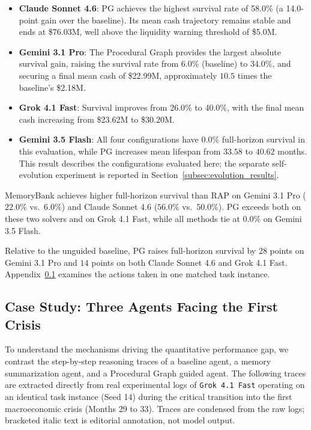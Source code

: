 \begin{itemize}[leftmargin=*]
    \item \textbf{Claude Sonnet 4.6}: PG achieves the highest survival rate of 58.0\% (a 14.0-point gain over the baseline). Its mean cash trajectory remains stable and ends at \$76.03M, well above the liquidity warning threshold of \$5.0M.
    \item \textbf{Gemini 3.1 Pro}: The Procedural Graph provides the largest absolute survival gain, raising the survival rate from 6.0\% (baseline) to 34.0\%, and securing a final mean cash of \$22.99M, approximately $10.5$ times the baseline's \$2.18M.
    \item \textbf{Grok 4.1 Fast}: Survival improves from 26.0\% to 40.0\%, with the final mean cash increasing from \$23.62M to \$30.20M.
    \item \textbf{Gemini 3.5 Flash}: All four configurations have $0.0\%$ full-horizon survival in this evaluation, while PG increases mean lifespan from $33.58$ to $40.62$ months. This result describes the configurations evaluated here; the separate self-evolution experiment is reported in Section~\ref{subsec:evolution_results}.
\end{itemize}

MemoryBank achieves higher full-horizon survival than RAP on Gemini 3.1 Pro ($22.0\%$ vs.\ $6.0\%$) and Claude Sonnet 4.6 ($56.0\%$ vs.\ $50.0\%$). PG exceeds both on these two solvers and on Grok 4.1 Fast, while all methods tie at $0.0\%$ on Gemini 3.5 Flash.

Relative to the unguided baseline, PG raises full-horizon survival by $28$ points on Gemini 3.1 Pro and $14$ points on both Claude Sonnet 4.6 and Grok 4.1 Fast. Appendix~\ref{app:cfo_traces} examines the actions taken in one matched task instance.

\subsection{Case Study: Three Agents Facing the First Crisis}
\label{app:cfo_traces}

To understand the mechanisms driving the quantitative performance gap, we contrast the step-by-step reasoning traces of a baseline agent, a memory summarization agent, and a Procedural Graph guided agent. The following traces are extracted directly from real experimental logs of \texttt{Grok 4.1 Fast} operating on an identical task instance (Seed 14) during the critical transition into the first macroeconomic crisis (Months 29 to 33). Traces are condensed from the raw logs; bracketed italic text is editorial annotation, not model output.

